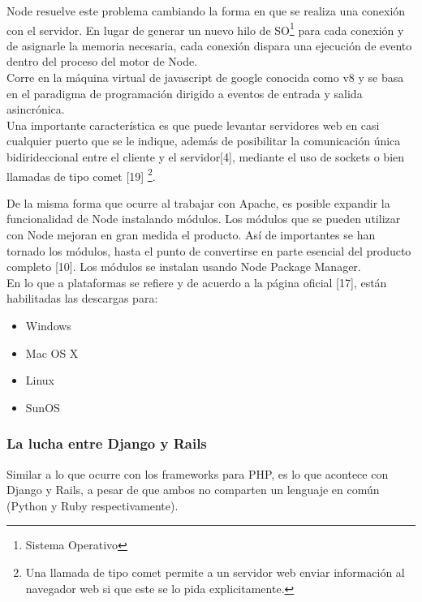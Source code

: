 Node resuelve este problema cambiando la forma en que se realiza una conexión con el servidor. En lugar de 
generar un nuevo hilo de SO\footnote{Sistema Operativo} para cada conexión y de asignarle la memoria necesaria, 
cada conexión dispara una ejecución de evento dentro del proceso del motor de Node.\\

Corre en la máquina virtual de javascript de google conocida como v8 y se basa en el paradigma
de programación dirigido a eventos de entrada y salida asincrónica.\\

Una importante característica es que puede levantar servidores web en casi cualquier puerto que se 
le indique, además de posibilitar la comunicación única bidirideccional entre el cliente y el servidor[4],
mediante el uso de sockets o bien llamadas de tipo comet [19] \footnote{Una llamada de tipo comet 
permite a un servidor web enviar información al navegador web si que este se lo pida explicitamente.}.


De la misma forma que ocurre al trabajar con Apache, es posible expandir la funcionalidad de Node 
instalando módulos. Los módulos que se pueden utilizar con Node mejoran en gran medida el producto.
Así de importantes se han tornado los módulos, hasta el punto de convertirse en parte esencial del 
producto completo [10]. Los módulos se instalan usando Node Package Manager.\\

En lo que a plataformas se refiere y de acuerdo a la página oficial [17], están habilitadas las 
descargas para:
\begin{itemize}
 \item Windows
 \item Mac OS X
 \item Linux
 \item SunOS
\end{itemize}


\subsubsection{La lucha entre Django y Rails}

Similar a lo que ocurre con los frameworks para PHP, es lo que acontece con Django y Rails, a pesar
de que ambos no comparten un lenguaje en común (Python y Ruby respectivamente).\\

